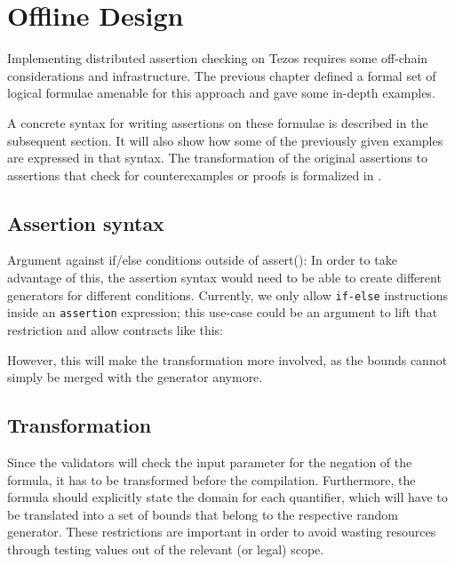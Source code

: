 \chapter{Offline Design}\label{chap:offline}
Implementing distributed assertion checking on Tezos requires some off-chain considerations and infrastructure. The previous chapter defined a formal set of logical formulae amenable for this approach and gave some in-depth examples. 

A concrete syntax for writing assertions on these formulae is described in the subsequent section. It will also show how some of the previously given examples are expressed in that syntax. The transformation of the original assertions to assertions that check for counterexamples or proofs is formalized in . 

\section{Assertion syntax}

Argument against if/else conditions outside of assert():
In order to take advantage of this, the assertion syntax would need to be able to create different generators for different conditions. Currently, we only allow \texttt{if-else} instructions inside an \texttt{assertion} expression; this use-case could be an argument to lift that restriction and allow contracts like this:
%

However, this will make the transformation more involved, as the bounds cannot simply be merged with the generator anymore.

\section{Transformation}\label{sec:transformation}
Since the validators will check the input parameter for the negation of the formula, it has to be transformed before the compilation. Furthermore, the formula should explicitly state the domain for each quantifier, which will have to be translated into a set of bounds that belong to the respective random generator. These restrictions are important in order to avoid wasting resources through testing values out of the relevant (or legal) scope.


